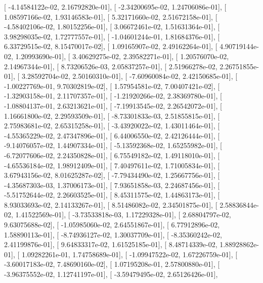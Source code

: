 \documentclass{article}
\begin{document}
       [ -4.14584122e-02,   2.16792820e-01],
       [ -2.34200695e-02,   1.24706086e-01],
       [  1.08597166e-02,   1.93146583e-01],
       [  5.32171660e-02,   2.51672158e-01],
       [ -4.58402106e-02,   1.80152256e-01],
       [  3.06672461e-02,   1.51631364e-01],
       [  3.98298035e-02,   1.72777557e-01],
       [ -1.04601244e-01,   1.81684376e-01],
       [  6.33729515e-02,   8.15470017e-02],
       [  1.09165907e-02,   2.49162264e-01],
       [  4.90719144e-02,   1.20993690e-01],
       [  3.40629275e-02,   2.39582271e-01],
       [  1.20576070e-02,   2.14967344e-01],
       [  8.73206526e-03,   2.05837257e-01],
       [  2.51966278e-02,   2.26751855e-01],
       [  3.28592704e-02,   2.50160310e-01],
       [ -7.60960084e-02,   2.42150685e-01],
       [ -1.00227769e-01,   9.70302819e-02],
       [  1.57954581e-02,   7.00407421e-02],
       [ -1.32903158e-01,   2.11707357e-01],
       [ -1.21920266e-02,   2.38369780e-01],
       [ -1.08804137e-01,   2.63213621e-01],
       [ -7.19913545e-02,   2.26542072e-01],
       [  1.16661800e-02,   2.29593509e-01],
       [ -8.73301833e-03,   2.51855815e-01],
       [  2.75983681e-02,   2.65315258e-01],
       [ -3.43920022e-02,   1.43011464e-01],
       [ -4.55365229e-02,   2.47347896e-01],
       [  6.44006550e-02,   2.42126444e-01],
       [ -9.14076057e-02,   1.44907334e-01],
       [ -5.13592368e-02,   1.65255982e-01],
       [ -6.72077606e-02,   2.24350828e-01],
       [  6.75549182e-02,   1.49118010e-01],
       [ -4.65536184e-02,   1.98912409e-01],
       [  7.40497611e-02,   1.71005834e-01],
       [  3.67943156e-02,   8.01625287e-02],
       [ -7.79434490e-02,   1.25667756e-01],
       [ -4.35687303e-03,   1.37006173e-01],
       [  7.93651858e-03,   2.24687456e-01],
       [ -5.51752644e-02,   2.26603525e-01],
       [  8.45311575e-02,   1.44863173e-01],
       [  8.93033693e-02,   2.14133267e-01],
       [  8.51486082e-02,   2.34501875e-01],
       [  2.58836844e-02,   1.41522569e-01],
       [ -3.73533818e-03,   1.17229328e-01],
       [  2.68804797e-02,   9.63075688e-02],
       [ -1.05985060e-02,   2.64551867e-01],
       [  6.77912896e-02,   1.58890113e-01],
       [ -8.74936127e-02,   1.30037709e-01],
       [ -8.35360242e-02,   2.41199876e-01],
       [  9.64833317e-02,   1.61525185e-01],
       [  8.48714339e-02,   1.88928862e-01],
       [  1.09282261e-01,   1.74758689e-01],
       [ -1.09947522e-02,   1.67226759e-01],
       [ -3.60017183e-02,   7.48690160e-02],
       [  1.07195208e-01,   2.57800880e-01],
       [ -3.96375552e-02,   1.12741197e-01],
       [ -3.59479495e-02,   2.65126426e-01],
\end{document}
